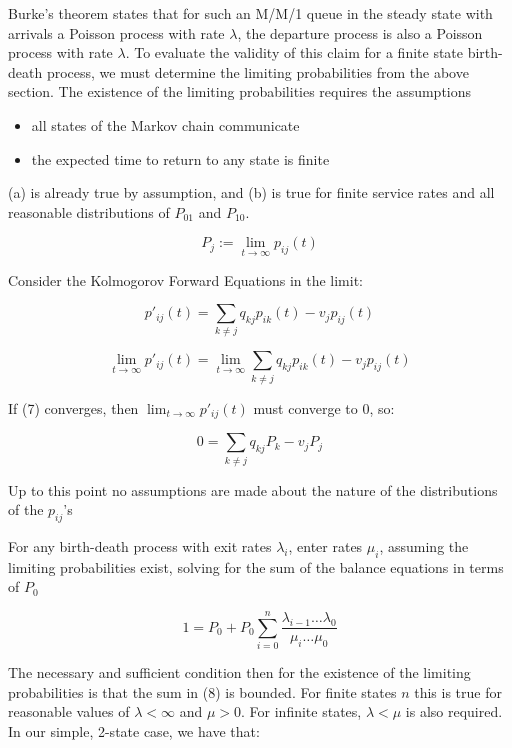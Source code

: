 \documentclass[]{article}
\begin{document}
Burke's theorem states that for such an M/M/1 queue in the steady state with arrivals a Poisson process with rate $\lambda$, the departure process is also a Poisson process with rate $\lambda$. To evaluate the validity of this claim for a finite state birth-death process, we must determine the limiting probabilities from the above section. The existence of the limiting probabilities requires the assumptions

\begin{itemize}
\item[a]all states of the Markov chain communicate
\item[b]the expected time to return to any state is finite
\end{itemize}

(a) is already true by assumption, and (b) is true for finite service rates and all reasonable distributions of $P_{01}$ and $P_{10}$.

\begin{equation}
P_j := \lim_{t \rightarrow \infty} p_{ij}(t)
\end{equation}

Consider the Kolmogorov Forward Equations in the limit:

\[p'_{ij}(t) = \sum_{k \neq j} q_{kj} p_{ik}(t) - v_{j}p_{ij}(t) \]

\[\lim_{t \rightarrow \infty} p'_{ij}(t) = \lim_{t \rightarrow \infty} \sum_{k \neq j} q_{kj} p_{ik}(t) - v_{j}p_{ij}(t) \]

If (7) converges, then $\lim_{t \rightarrow \infty} p'_{ij}(t)$ must converge to 0, so:

\[0 = \sum_{k \neq j} q_{kj} P_k - v_{j}P_j \]

Up to this point no assumptions are made about the nature of the distributions of the $p_{ij}$'s

For any birth-death process with exit rates $\lambda_i$, enter rates $\mu_i$, assuming the limiting probabilities exist, solving for the sum of the balance equations in terms of $P_{0}$

\begin{equation}
1 = P_0 + P_0 \sum_{i=0}^{n} \frac{\lambda_{i-1} \ldots \lambda_{0}}{\mu_i \ldots \mu_0}
\end{equation}

The necessary and sufficient condition then for the existence of the limiting probabilities is that the sum in (8) is bounded. For finite states $n$ this is true for reasonable values of $\lambda < \infty$ and $\mu > 0$. For infinite states, $\lambda < \mu$ is also required. In our simple, 2-state case, we have that:
\end{document}
